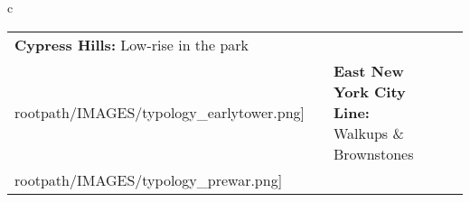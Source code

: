 \begin{table}[H]
        \begin{tabular}{c}
        \begin{tabular}{m{1.25in} m{2in} m{.1in} m{1.25in} m{2in}}
\textbf{Cypress Hills:} {Low-rise in the park} & \texttt{[image: \\rootpath/IMAGES/typology\_earlytower.png]} & & \textbf{East New York City Line:} {Walkups \& Brownstones} & \texttt{[image: \\rootpath/IMAGES/typology\_prewar.png]}
\end{tabular}\end{tabular}
        \end{table}